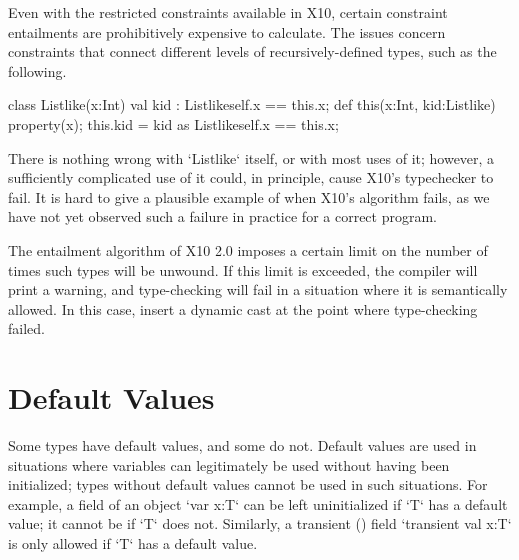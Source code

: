 Even with the restricted constraints available in X10, certain
constraint entailments are prohibitively expensive to calculate.  The issues
concern constraints that connect different levels of recursively-defined
types, such as the following.  
\begin{xten}
class Listlike(x:Int) {
  val kid : Listlike{self.x == this.x};
  def this(x:Int, kid:Listlike) { 
     property(x); 
     this.kid = kid as Listlike{self.x == this.x};}
}
\end{xten}
%
There is nothing wrong with \xcd`Listlike` itself, or with most uses of it;
however, a sufficiently complicated use of it could, in principle, cause X10's
typechecker to fail. 
It is hard to give a plausible example of when X10's algorithm fails, as we
have not yet observed such a failure in practice for a correct program.  

The entailment algorithm of X10 2.0 imposes a certain limit on the number of
times such types will be unwound.   If this limit is exceeded, the compiler
will print a warning, and type-checking will fail in a situation where it is
semantically allowed.  In this case, insert a dynamic cast at the point where
type-checking failed.  





\section{Default Values}
\label{DefaultValues}

Some types have default values, and some do not. Default values are used in
situations where variables can legitimately be used without having been
initialized; types without default values cannot be used in such situations.
For example, a field of an object \xcd`var x:T` can be left uninitialized if
\xcd`T` has a default value; it cannot be if \xcd`T` does not. Similarly, a
transient () field \xcd`transient val x:T` is only
allowed if \xcd`T` has a default value.

